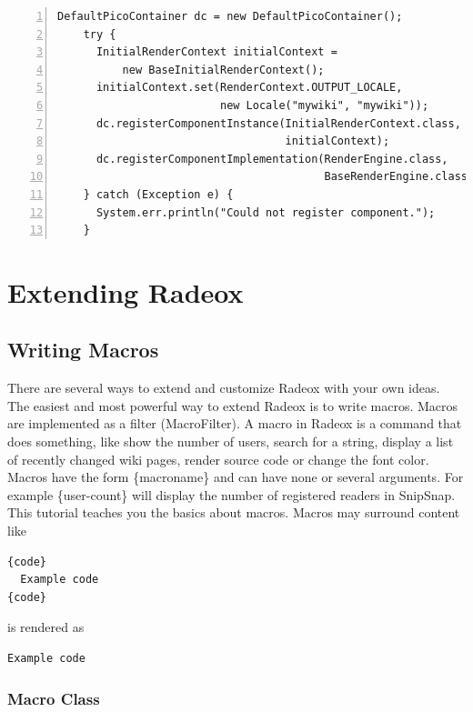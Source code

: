 \documentclass[a4paper,pdftex]{article}
\begin{document}
\begin{Verbatim}[gobble=4,frame=single,numbers=left,fontsize=\small]
    DefaultPicoContainer dc = new DefaultPicoContainer();
    try {
      InitialRenderContext initialContext =
          new BaseInitialRenderContext();
      initialContext.set(RenderContext.OUTPUT_LOCALE,
                         new Locale("mywiki", "mywiki"));
      dc.registerComponentInstance(InitialRenderContext.class,
                                   initialContext);
      dc.registerComponentImplementation(RenderEngine.class,
                                         BaseRenderEngine.class);
    } catch (Exception e) {
      System.err.println("Could not register component.");
    }
\end{Verbatim}

\section{Extending Radeox}

\subsection{Writing Macros}

There are several ways to extend and customize Radeox with your own ideas. 
The easiest and most powerful way to extend Radeox is to write macros. Macros
are implemented as a filter (MacroFilter). A macro in Radeox is a command that does something, 
like show the number of users,  search for a string, display a list of recently 
changed wiki pages, render source code or change the font color. 
Macros have the form \{macroname\} and can have none or several arguments.
For example \{user-count\} will display the number of registered readers in
SnipSnap.  This tutorial teaches you the basics about macros. Macros may surround content like

\begin{verbatim}
{code}
  Example code
{code}
\end{verbatim}

is rendered as

\begin{verbatim}
Example code
\end{verbatim}

\subsubsection{Macro Class}
\end{document}
